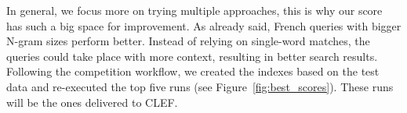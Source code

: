 In general, we focus more on trying multiple approaches, this is why our score has such a big space for improvement.
As already said, French queries with bigger N-gram sizes perform better.
Instead of relying on single-word matches, the queries could take place with more context, resulting in better search
results.\\

Following the competition workflow, we created the indexes based on the test data and re-executed the top five
runs (see Figure~\ref{fig:best_scores}).
These runs will be the ones delivered to CLEF\@.

